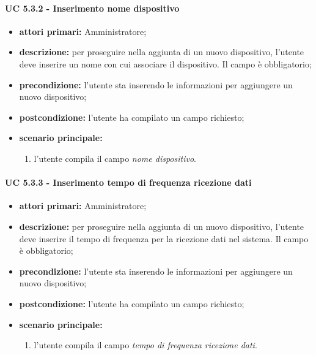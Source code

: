 				\paragraph{UC 5.3.2 - Inserimento nome dispositivo}
				\begin{itemize}
					\item \textbf{attori primari:} Amministratore;
					\item \textbf{descrizione:} per proseguire nella aggiunta di un nuovo dispositivo, l'utente deve inserire un nome con cui associare il dispositivo. Il campo è obbligatorio;
					\item \textbf{precondizione:} l'utente sta inserendo le informazioni per aggiungere un nuovo dispositivo;
					\item \textbf{postcondizione:} l'utente ha compilato un campo richiesto;
					\item \textbf{scenario principale:}
					\begin{enumerate}
						\item{l'utente compila il campo \textit{nome dispositivo}.}
					\end{enumerate}
				\end{itemize}

				\paragraph{UC 5.3.3 - Inserimento tempo di frequenza ricezione dati}
				\begin{itemize}
					\item \textbf{attori primari:} Amministratore;
					\item \textbf{descrizione:} per proseguire nella aggiunta di un nuovo dispositivo, l'utente deve inserire il tempo di frequenza per la ricezione dati nel sistema. Il campo è obbligatorio;
					\item \textbf{precondizione:} l'utente sta inserendo le informazioni per aggiungere un nuovo dispositivo;
					\item \textbf{postcondizione:} l'utente ha compilato un campo richiesto;
					\item \textbf{scenario principale:}
					\begin{enumerate}
						\item{l'utente compila il campo \textit{tempo di frequenza ricezione dati}.}
					\end{enumerate}
				\end{itemize}


